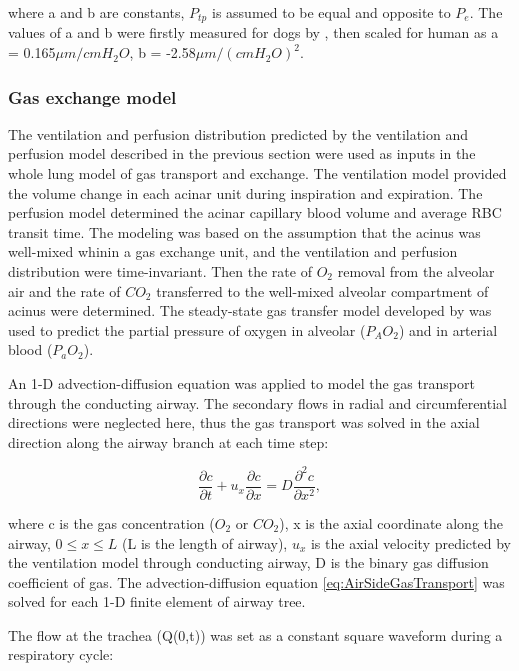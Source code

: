 \noindent where a and b are constants, $P_{tp}$ is assumed to be equal and opposite to $P_e$. The values of a and b were firstly measured for dogs by \cite{glazier1969measurements}, then scaled for human as a = 0.165$\mu m/cmH_2O$, b = -2.58$\mu m/{(cmH_2O)}^2$.

\subsubsection{Gas exchange model}
The ventilation and perfusion distribution predicted by the ventilation and perfusion model described in the previous section were used as inputs in the whole lung model of gas transport and exchange. The ventilation model provided the volume change in each acinar unit during inspiration and expiration. The perfusion model determined the acinar capillary blood volume and average RBC transit time. The modeling was based on the assumption that the acinus was well-mixed whinin a gas exchange unit, and the ventilation and perfusion distribution were time-invariant. Then the rate of $O_2$ removal from the alveolar air and the rate of $CO_2$ transferred to the well-mixed alveolar compartment of acinus were determined. The steady-state gas transfer model developed by \cite{kapitan1986computer, swan2010multi} was used to predict the partial pressure of oxygen in alveolar ($P_AO_2$) and in arterial blood ($P_aO_2$).

An 1-D advection-diffusion equation was applied to model the gas transport through the conducting airway. The secondary flows in radial and circumferential directions were neglected here, thus the gas transport was solved in the axial direction along the airway branch at each time step:

\begin{equation} 
 \label{eq:AirSideGasTransport}
 \frac{\partial c}{\partial t} + u_x \frac{\partial c}{\partial x} = D \frac{\partial^2c}{\partial x^2},
\end{equation}

\noindent where c is the gas concentration ($O_2$ or $CO_2$), x is the axial coordinate along the airway, $0 \leq x \leq L$ (L is the length of airway), $u_x$ is the axial velocity predicted by the ventilation model through conducting airway, D is the binary gas diffusion coefficient of gas. The advection-diffusion equation \ref{eq:AirSideGasTransport} was solved for each 1-D finite element of airway tree.

The flow at the trachea (Q(0,t)) was set as a constant square waveform during a respiratory cycle:


